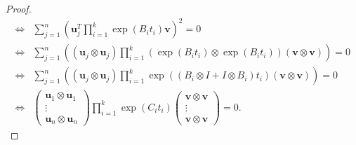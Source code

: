 \begin{proof}
\begin{align*}
\Leftrightarrow &\sum \limits_{j=1}^{n} \left( \boldsymbol{u}_{j}^{T} \prod \limits_{i=1}^{k} \exp(B_{i} t_{i}) \boldsymbol{v} \right)^{2} = 0 \\
\Leftrightarrow &\sum \limits_{j=1}^{n} \left( \left( \boldsymbol{u}_{j} \otimes \boldsymbol{u}_{j} \right) \prod \limits_{i=1}^{k} \left( \exp( B_{i} t_{i} ) \otimes \exp(B_{i} t_{i}) \right) \left( \boldsymbol{v} \otimes \boldsymbol{v} \right) \right) = 0 \\
\Leftrightarrow &\sum \limits_{j=1}^{n} \left( \left( \boldsymbol{u}_{j} \otimes \boldsymbol{u}_{j} \right) \prod \limits_{i=1}^{k} \exp\left((B_{i} \otimes I + I \otimes B_{i}) t_{i} \right) \left( \boldsymbol{v} \otimes \boldsymbol{v} \right) \right) = 0 \\
\Leftrightarrow &\begin{pmatrix} \boldsymbol{u}_{1} \otimes \boldsymbol{u}_{1} \\ \vdots \\ \boldsymbol{u}_{n} \otimes \boldsymbol{u}_{n} \end{pmatrix} \prod \limits_{i=1}^{k} \exp( C_{i} t_{i} ) \begin{pmatrix} \boldsymbol{v} \otimes \boldsymbol{v} \\ \vdots \\ \boldsymbol{v} \otimes \boldsymbol{v} \end{pmatrix} = 0 .
\end{align*}
\end{proof}